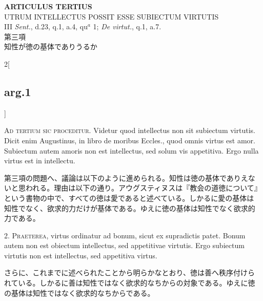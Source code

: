 \documentclass[paper=a4paper,fontsize=10pt,jafontsize=9pt,titlepage]{jlreq}
\begin{document}
\newpage
{}
{}
\setcounter{section}{3}
\setcounter{subsection}{0}


\begin{center}
{\Large {\bfseries ARTICULUS TERTIUS}}\\
{\large UTRUM INTELLECTUS POSSIT ESSE SUBIECTUM VIRTUTIS}\\
{\footnotesize III {\itshape Sent.}, d.23, q.1, a.4, qu$^{a}$ 1;
 {\itshape De virtut.}, q.1, a.7.}\\
{\Large 第三項\\知性が徳の基体でありうるか}
\end{center}

\begin{paracol}{2}[\subsection{arg.1}]

{\scshape Ad tertium sic proceditur}. Videtur quod intellectus non sit
subiectum virtutis. Dicit enim Augustinus, in libro de moribus
Eccles., quod omnis virtus est amor. Subiectum autem amoris non est
intellectus, sed solum vis appetitiva. Ergo nulla virtus est in
intellectu.

\switchcolumn

第三項の問題へ、議論は以下のように進められる。知性は徳の基体でありえな
いと思われる。理由は以下の通り。アウグスティヌスは『教会の道徳について』
という書物の中で、すべての徳は愛であると述べている。しかるに愛の基体は
知性でなく、欲求的力だけが基体である。ゆえに徳の基体は知性でなく欲求的
力である。


2. {\scshape Praeterea}, virtus ordinatur ad bonum, sicut ex supradictis
patet. Bonum autem non est obiectum intellectus, sed appetitivae
virtutis. Ergo subiectum virtutis non est intellectus, sed appetitiva
virtus.

\switchcolumn

さらに、これまでに述べられたことから明らかなとおり、徳は善へ秩序付けら
れている。しかるに善は知性ではなく欲求的なちからの対象である。ゆえに徳
の基体は知性ではなく欲求的なちからである。



\end{paracol}
\end{document}
